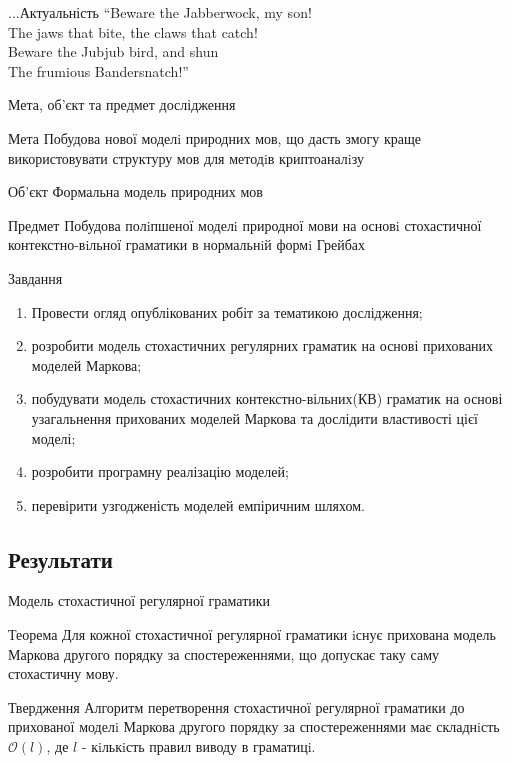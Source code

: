 \documentclass{beamer}
\begin{document}
\begin{darkframes}
\begin{frame}{...Актуальність}
      “Beware the Jabberwock, my son!\\
      The jaws that bite, the claws that catch!\\
      Beware the Jubjub bird, and shun\\
      The frumious Bandersnatch!”\\
    \end{frame}

    \begin{frame}[label=lists]{Мета, об'єкт та предмет дослідження}
      \begin{exampleblock}{Мета}
      Побудова нової моделi природних мов, що дасть змогу краще використовувати структуру мов для методiв криптоаналiзу
      \end{exampleblock}
      \begin{block}{Об'єкт}
        Формальна модель природних мов
      \end{block}
      \begin{block}{Предмет}
        Побудова полiпшеної моделi природної мови на основi стохастичної контекстно-вiльної граматики в нормальнiй формi Грейбах
      \end{block}

    \end{frame}

    \begin{frame}{Завдання}
      \begin{enumerate}
      \item Провести огляд опублікованих робіт за тематикою дослідження;
      \item розробити модель стохастичних регулярних граматик на основі прихованих моделей Маркова;
      \item побудувати модель стохастичних контекстно-вільних(КВ) граматик на основі узагальнення прихованих моделей Маркова та дослідити властивості цієї моделі;
      \item розробити програмну реалізацію моделей;
      \item перевірити узгодженість моделей емпіричним шляхом.
      \end{enumerate}
    \end{frame}
    \subsection{Результати}
    \begin{frame}{Модель стохастичної регулярної граматики}
      \begin{block}{Теорема}
        Для кожної стохастичної регулярної граматики iснує прихована модель Маркова другого порядку за спостереженнями, що допускає таку саму стохастичну мову.
      \end{block}
      \begin{block}{Твердження}
        Алгоритм перетворення стохастичної регулярної граматики до прихованої моделi Маркова другого порядку за спостереженнями має складнiсть $\mathcal{O}(l)$, де $l$ - кiлькiсть правил виводу в
        граматицi.
      \end{block}
    \end{frame}


\end{darkframes}
\end{document}
